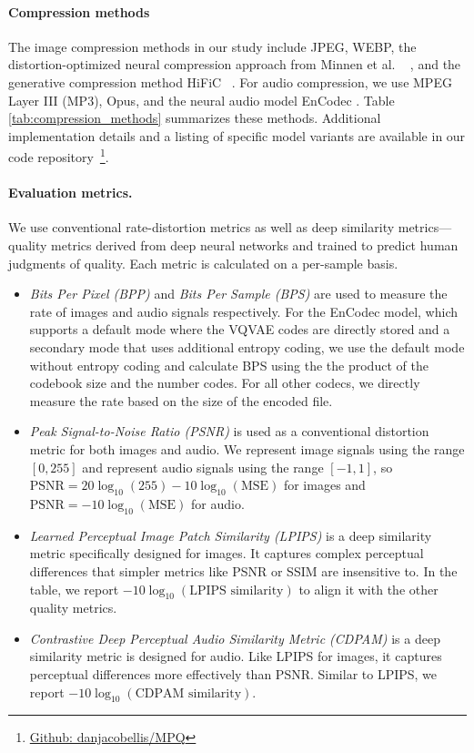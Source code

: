 \documentclass[10pt,twocolumn,letterpaper]{article}
\begin{document}
\paragraph{{Compression methods}}The image compression methods in our study include JPEG, WEBP, the distortion-optimized neural compression approach from Minnen et al. ~\cite{minnen2018joint} , and the generative compression method HiFiC ~\cite{mentzer2020high}. For audio compression, we use MPEG Layer III (MP3), Opus, and the neural audio model EnCodec \cite{defossez2022high}. Table \ref{tab:compression_methods} summarizes these methods. Additional implementation details and a listing of specific model variants are available in our code repository~\footnote{\href{https://github.com/danjacobellis/MPQ}{Github: danjacobellis/MPQ}}.

\paragraph{Evaluation metrics.} We use conventional rate-distortion metrics as well as deep similarity metrics---quality metrics derived from deep neural networks and trained to predict human judgments of quality. Each metric is calculated on a per-sample basis.
\begin{itemize}

\item \textit{Bits Per Pixel (BPP)} and \textit{Bits Per Sample (BPS)} are used to measure the rate of images and audio signals respectively. For the EnCodec model, which supports a default mode where the VQVAE codes are directly stored and a secondary mode that uses additional entropy coding, we use the default mode without entropy coding and calculate BPS using the the product of the codebook size and the number codes. For all other codecs, we directly measure the rate based on the size of the encoded file.

\item \textit{Peak Signal-to-Noise Ratio (PSNR)} is used as a conventional distortion metric for both images and audio. We represent image signals using the range $[0,255]$ and represent audio signals using the range $[-1,1]$, so \( \text{PSNR} = 20\log_{10}(255) - 10\log_{10}(\text{MSE}) \) for images and \( \text{PSNR} = -10\log_{10}(\text{MSE}) \) for audio.

\item \textit{Learned Perceptual Image Patch Similarity (LPIPS)}\cite{zhang2018unreasonable} is a deep similarity metric specifically designed for images. It captures complex perceptual differences that simpler metrics like PSNR or SSIM are insensitive to. In the table, we report \( -10\log_{10}(\text{LPIPS similarity}) \) to align it with the other quality metrics.

\item  \textit{Contrastive Deep Perceptual Audio Similarity Metric (CDPAM)} \cite{manocha2021cdpam} is a deep similarity metric is designed for audio. Like LPIPS for images, it captures perceptual differences more effectively than PSNR. Similar to LPIPS, we report \( -10\log_{10}(\text{CDPAM similarity}) \).
\end{itemize}
\end{document}
